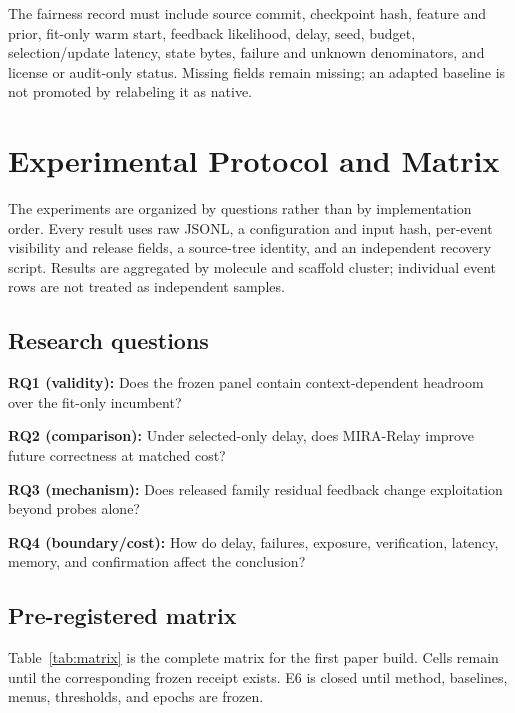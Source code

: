 \documentclass[sigconf,anonymous]{aamas}
\newcommand{\tbd}{\text{TBD}}
\begin{document}
The fairness record must include source commit, checkpoint hash, feature and prior, fit-only warm start, feedback likelihood, delay, seed, budget, selection/update latency, state bytes, failure and unknown denominators, and license or audit-only status. Missing fields remain missing; an adapted baseline is not promoted by relabeling it as native.

\section{Experimental Protocol and Matrix}
The experiments are organized by questions rather than by implementation order. Every result uses raw JSONL, a configuration and input hash, per-event visibility and release fields, a source-tree identity, and an independent recovery script. Results are aggregated by molecule and scaffold cluster; individual event rows are not treated as independent samples.

\subsection{Research questions}
\textbf{RQ1 (validity):} Does the frozen panel contain context-dependent headroom over the fit-only incumbent?\par
\textbf{RQ2 (comparison):} Under selected-only delay, does MIRA-Relay improve future correctness at matched cost?\par
\textbf{RQ3 (mechanism):} Does released family residual feedback change exploitation beyond probes alone?\par
\textbf{RQ4 (boundary/cost):} How do delay, failures, exposure, verification, latency, memory, and confirmation affect the conclusion?

\subsection{Pre-registered matrix}
Table~\ref{tab:matrix} is the complete matrix for the first paper build. Cells remain \tbd{} until the corresponding frozen receipt exists. E6 is closed until method, baselines, menus, thresholds, and epochs are frozen.
\end{document}
